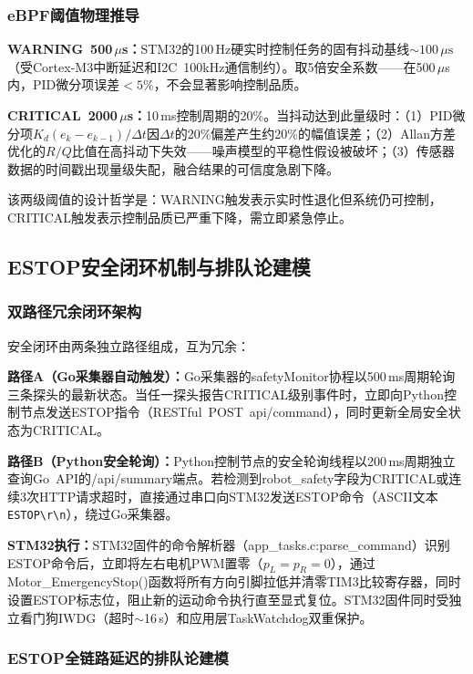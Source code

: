 \documentclass{rjthesis}
\begin{document}
\subsubsection{eBPF阈值物理推导}

\textbf{WARNING~500\,$\mu$s：}STM32的100\,Hz硬实时控制任务的固有抖动基线$\sim100\,\mu\text{s}$（受Cortex-M3中断延迟和I2C~100kHz通信制约）。取5倍安全系数——在500\,$\mu$s内，PID微分项误差$<5\%$，不会显著影响控制品质。

\textbf{CRITICAL~2000\,$\mu$s：}10\,ms控制周期的20\%。当抖动达到此量级时：（1）PID微分项$K_d(e_k-e_{k-1})/\Delta t$因$\Delta t$的20\%偏差产生约20\%的幅值误差；（2）Allan方差优化的$R/Q$比值在高抖动下失效——噪声模型的平稳性假设被破坏；（3）传感器数据的时间戳出现量级失配，融合结果的可信度急剧下降。

该两级阈值的设计哲学是：WARNING触发表示实时性退化但系统仍可控制，CRITICAL触发表示控制品质已严重下降，需立即紧急停止。

\subsection{ESTOP安全闭环机制与排队论建模}

\subsubsection{双路径冗余闭环架构}

安全闭环由两条独立路径组成，互为冗余：

\textbf{路径A（Go采集器自动触发）：}Go采集器的safetyMonitor协程以500\,ms周期轮询三条探头的最新状态。当任一探头报告CRITICAL级别事件时，立即向Python控制节点发送ESTOP指令（RESTful~POST~api/command），同时更新全局安全状态为CRITICAL。

\textbf{路径B（Python安全轮询）：}Python控制节点的安全轮询线程以200\,ms周期独立查询Go~API的/api/summary端点。若检测到robot\_safety字段为CRITICAL或连续3次HTTP请求超时，直接通过串口向STM32发送ESTOP命令（ASCII文本\texttt{ESTOP\textbackslash r\textbackslash n}），绕过Go采集器。

\textbf{STM32执行：}STM32固件的命令解析器（app\_tasks.c:parse\_command）识别ESTOP命令后，立即将左右电机PWM置零（$p_L=p_R=0$），通过Motor\_EmergencyStop()函数将所有方向引脚拉低并清零TIM3比较寄存器，同时设置ESTOP标志位，阻止新的运动命令执行直至显式复位。STM32固件同时受独立看门狗IWDG（超时$\sim$16\,s）和应用层TaskWatchdog双重保护。

\subsubsection{ESTOP全链路延迟的排队论建模}
\end{document}
